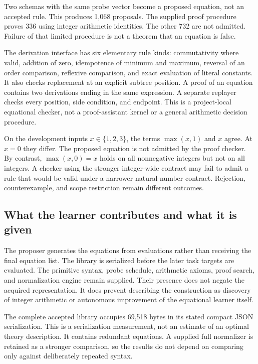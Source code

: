 Two schemas with the same probe vector become a proposed equation, not an accepted rule. This produces 1,068 proposals. The supplied proof procedure proves 336 using integer arithmetic identities. The other 732 are not admitted. Failure of that limited procedure is not a theorem that an equation is false.

The derivation interface has six elementary rule kinds: commutativity where valid, addition of zero, idempotence of minimum and maximum, reversal of an order comparison, reflexive comparison, and exact evaluation of literal constants. It also checks replacement at an explicit subtree position. A proof of an equation contains two derivations ending in the same expression. A separate replayer checks every position, side condition, and endpoint. This is a project-local equational checker, not a proof-assistant kernel or a general arithmetic decision procedure.

\begin{SIIcounterexample}\label{SII:ex:probe-equation}
On the development inputs $x\in\{1,2,3\}$, the terms $\max(x,1)$ and $x$ agree. At $x=0$ they differ. The proposed equation is not admitted by the proof checker. By contrast, $\max(x,0)=x$ holds on all nonnegative integers but not on all integers. A checker using the stronger integer-wide contract may fail to admit a rule that would be valid under a narrower natural-number contract. Rejection, counterexample, and scope restriction remain different outcomes.
\end{SIIcounterexample}

\subsection{What the learner contributes and what it is given}
The proposer generates the equations from evaluations rather than receiving the final equation list. The library is serialized before the later task targets are evaluated. The primitive syntax, probe schedule, arithmetic axioms, proof search, and normalization engine remain supplied. Their presence does not negate the acquired representation. It does prevent describing the construction as discovery of integer arithmetic or autonomous improvement of the equational learner itself.

The complete accepted library occupies 69,518 bytes in its stated compact JSON serialization. This is a serialization measurement, not an estimate of an optimal theory description. It contains redundant equations. A supplied full normalizer is retained as a stronger comparison, so the results do not depend on comparing only against deliberately repeated syntax.

